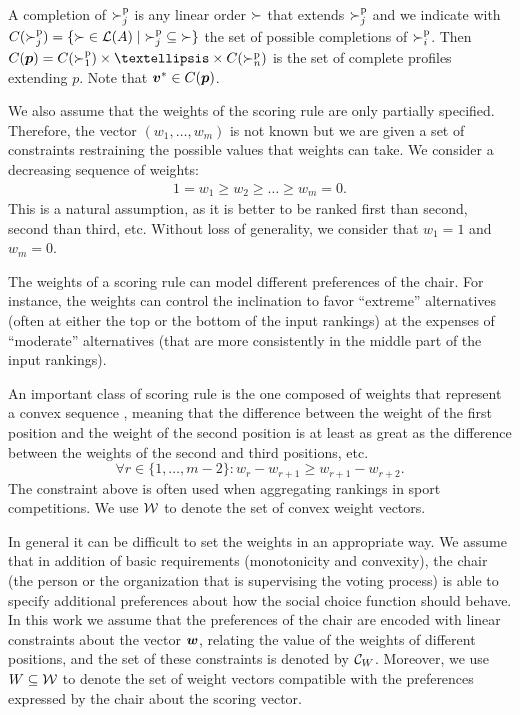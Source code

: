 \documentclass[sigconf, anonymous]{aamas}
\begin{document}
A completion of $\succ^\text{p}_j$ is any linear order $\succ$ that extends $\succ^\text{p}_j$ and we indicate with $C(\ppref_j) = \set{{\succ} \in \linors \suchthat {\ppref_j} \subseteq {\succ}}$ the set of possible completions of $\succ^\text{p}_i$.
Then $C(\pprofile)=C(\ppref_1)\times … \times C(\ppref_n)$ is the set of complete profiles extending $p$. Note that $\bm{v}^* \in C({\bm{p}})$.

We also assume that the weights of the scoring rule are only partially specified.
Therefore, the vector $(w_1,\ldots,w_m)$  is not known but we are given a set of constraints restraining the possible values that weights can take.
We consider a decreasing sequence of weights:
\begin{align}
	1=w_{1} ≥ w_{2} ≥ \ldots ≥ w_{m}=0. \label{eq:monotone}
\end{align}
This is a natural assumption, as it is better to be ranked first than second, second than third, etc. 
Without loss of generality, we consider that $w_1=1$ and $w_m=0$. 

The weights of a scoring rule can model different preferences of the chair. 
For instance, the weights can control the inclination to favor ``extreme'' alternatives (often at either the top or the bottom of the input rankings) at the expenses of ``moderate'' alternatives (that are more consistently in the middle part of the input rankings).

An important class of scoring rule is the one composed of weights that represent a convex sequence \citep{Stein1994,Llamazares2016}, meaning that the difference between the weight of the first position and the weight of the second position is at least as great as the difference between the weights of the second and third positions, etc.
\begin{equation} 
	\label{eq:convexity}
	\forall r \in \{1,\ldots,m-2\}: w_r - w_{r+1} \geq w_{r+1}-w_{r+2}.
\end{equation}
The constraint above is often used when aggregating rankings in sport competitions.
We use $\mathcal{W}$ to denote the set of convex weight vectors.

In general it can be difficult to set the weights in an appropriate way.
We assume that in addition of basic requirements (monotonicity and convexity), the chair (the person or the organization that is supervising the voting process) is able to specify additional preferences about how the social choice function should behave.
In this work we assume that the preferences of the chair are encoded with linear constraints about the vector $\bm{w}$, relating the value of the weights of different positions, and the set of these constraints is denoted by $\mathcal{C}_W$. Moreover, we use $W \subseteq \mathcal{W}$ to denote the set of weight vectors compatible with the preferences expressed by the chair about the scoring vector.
\end{document}
